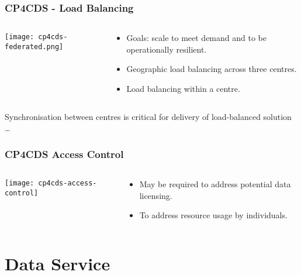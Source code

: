 \documentclass{beamer}
\begin{document}
\begin{frame}
\frametitle<presentation>{CP4CDS - Load Balancing}
  \begin{columns}[c]
    \begin{column}{.5\textwidth}
      \centering
      \texttt{[image: cp4cds-federated.png]}
    \end{column}
    \begin{column}{.5\textwidth}
      \begin{itemize}
        \item Goals: scale to meet demand and to be operationally resilient.
        \item Geographic load balancing across three centres.
        \item Load balancing within a centre.
      \end{itemize}
    \end{column}
  \end{columns}
  \vfill
  Synchronisation between centres is critical for delivery of load-balanced solution \ldots

\end{frame}

\begin{frame}
\frametitle<presentation>{CP4CDS Access Control}

  \begin{columns}[c]
    \begin{column}{.5\textwidth}
      \centering
      \texttt{[image: cp4cds-access-control]}
    \end{column}
    \begin{column}{.5\textwidth}
      \begin{itemize}
        \item May be required to address potential data licensing.
        \item To address resource usage by individuals.
      \end{itemize}
    \end{column}
  \end{columns}

\end{frame}

\section{Data Service}
\end{document}

